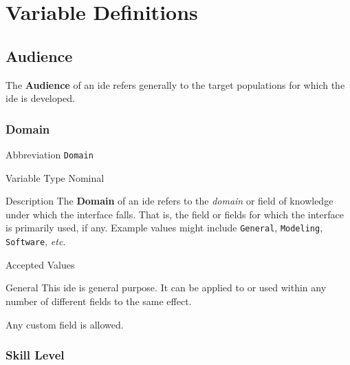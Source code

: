 \section{Variable Definitions}
\label{sec:definitions}

\subsection{Audience}
\label{subsec:audience}

The \textbf{Audience} of an \ac{ide} refers generally to the target
populations for which the \ac{ide} is developed.

\subsubsection{Domain}
\label{subsubsec:domain}

\begin{AlignedDesc}
  \item[Abbreviation] \texttt{Domain}

  \item[Variable Type] Nominal

  \item[Description] The \textbf{Domain} of an \ac{ide} refers to the
  \textit{domain} or field of knowledge under which the interface falls.
  That is, the field or fields for which the interface is primarily used,
  if any. Example values might include \texttt{General}, \texttt{Modeling},
  \texttt{Software}, \textit{etc}.

  \item[Accepted Values]

  \begin{AlignedDesc}
    \item[General] This \ac{ide} is general purpose. It can be applied to
    or used within any number of different fields to the same effect.
    \item[\textellipsis] Any custom field is allowed.
  \end{AlignedDesc}

\end{AlignedDesc}

\subsubsection{Skill Level}
\label{subsubsec:skill}

